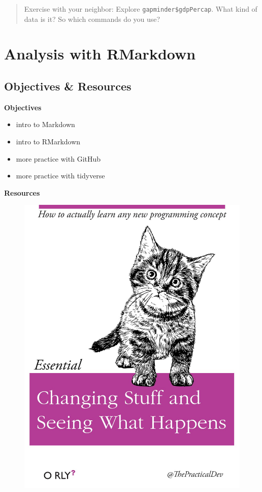 \documentclass[]{book}
\providecommand{\tightlist}{%
  \setlength{\itemsep}{0pt}\setlength{\parskip}{0pt}}
\theoremstyle{definition}
\theoremstyle{definition}
\theoremstyle{definition}
\theoremstyle{remark}
\begin{document}
\begin{quote}
Exercise with your neighbor: Explore \texttt{gapminder\$gdpPercap}. What
kind of data is it? So which commands do you use?
\end{quote}

\chapter{Analysis with RMarkdown}\label{rmarkdown}

\section{Objectives \& Resources}\label{objectives-resources-4}

\textbf{Objectives}

\begin{itemize}
\tightlist
\item
  intro to Markdown
\item
  intro to RMarkdown
\item
  more practice with GitHub
\item
  more practice with tidyverse
\end{itemize}

\textbf{Resources}

\begin{figure}[htbp]
\centering
\includegraphics{img/practicalDev_changingstuff.jpg}
\caption{}
\end{figure}
\end{document}
